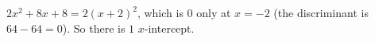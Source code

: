 $2x^2+8x+8=2(x+2)^2$, which is $0$ only at $x=-2$ (the discriminant is $64-64=0$). So there is $\boxed{1}$ $x$-intercept.
